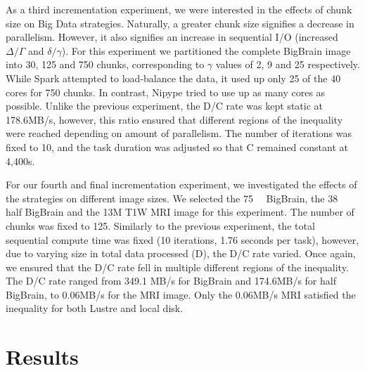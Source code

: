 As a third incrementation experiment, we were interested in the effects of chunk
size on Big Data strategies. Naturally, a greater chunk size signifies a
decrease in parallelism. However, it also signifies an increase in sequential
I/O (increased $\Delta/\Gamma$ and $\delta/\gamma$). For this experiment we
partitioned the complete BigBrain image into 30, 125 and 750 chunks,
corresponding to $\gamma$ values of 2, 9 and 25 respectively. While Spark
attempted to load-balance the data, it used up only 25 of the 40 cores for 750
chunks. In contrast, Nipype tried to use up as many cores as possible. Unlike
the previous experiment, the D/C rate was kept static at 178.6MB/s, however,
this ratio ensured that different regions of the inequality were reached
depending on amount of parallelism. The number of iterations was fixed to 10,
and the task duration was adjusted so that C remained constant at 4,400s.

For our fourth and final incrementation experiment, we investigated the effects
of the strategies on different image sizes. We selected the \SI{75}{\giga\byte} BigBrain, the
\SI{38}{\giga\byte} half BigBrain and the 13M T1W MRI image for this experiment. The number of
chunks was fixed to 125. Similarly to the previous experiment, the total
sequential compute time was fixed (10 iterations, 1.76 seconds per task),
however, due to varying size in total data processed (D), the D/C rate varied.
Once again, we ensured that the D/C rate fell in multiple different regions of
the inequality. The D/C rate ranged from 349.1 MB/s for BigBrain and 174.6MB/s
for half BigBrain, to 0.06MB/s for the MRI image. Only the 0.06MB/s MRI
satisfied the inequality for both Lustre and local disk.









\section{Results} %
\label{sec:inmem:results}

